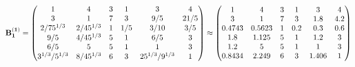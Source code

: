 \documentclass[10pt,a4paper]{article}
\begin{document}
	\[
		\bold{B_1^{(1)}} = 
		\begin{pmatrix}
			{1}{} & {{4}}{} & {{3}}{} & {1}{} & {{3}}{} & {{4}}{} \\
			{{3}}{} & {1}{} & {{7}}{} & {{3}}{} & {{9}} / {{5}} & {{21}} / {{5}} \\
			{{2}} / {{75^ {1 / 3}}} & {{2}} / {{45^ {1 / 3}}} & {1}{} & {1} / {{5}} & {{3}} / {{10}} & {{3}} / {{5}} \\
			{{9}} / {{5}} & {{4}} / {{45^ {1 / 3}}} & {{5}}{} & {1}{} & {{6}} / {{5}} & {{3}}{} \\
			{{6}} / {{5}} & {{5}}{} & {{5}}{} & {1}{} & {1}{} & {{3}}{} \\
			{{3^ {1 / 3}}} / {{5^ {1 / 3}}} & {{8}} / {{45^ {1 / 3}}} & {{6}}{} & {{3}}{} & {{25^ {1 / 3}}} / {{9^ {1 / 3}}} & {1}{} \\
		\end{pmatrix}
		\approx
		\begin{pmatrix}
			1        & 4        & 3        & 1        & 3        & 4        \\
			3        & 1        & 7        & 3        & 1.8      & 4.2      \\
			0.4743   & 0.5623   & 1        & 0.2      & 0.3      & 0.6      \\
			1.8      & 1.125    & 5        & 1        & 1.2      & 3        \\
			1.2      & 5        & 5        & 1        & 1        & 3        \\
			0.8434   & 2.249    & 6        & 3        & 1.406    & 1        \\
		\end{pmatrix}
	\]
\end{document}
